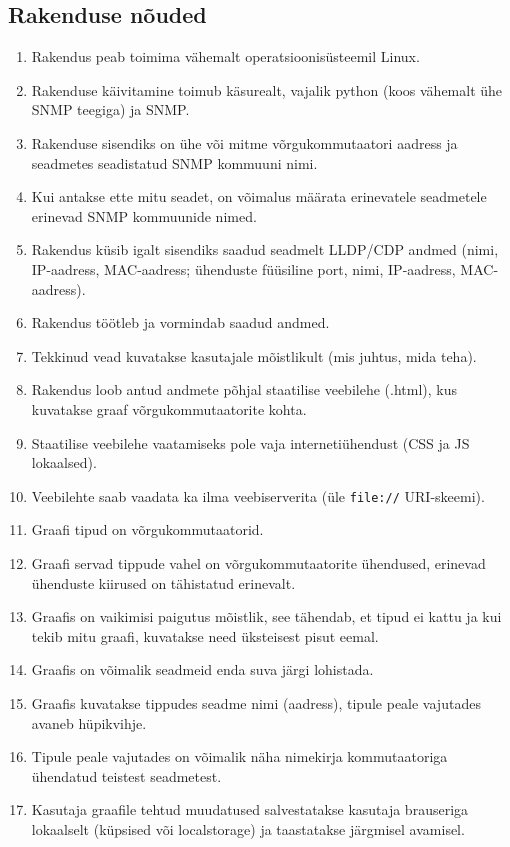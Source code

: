 \documentclass[12pt]{article}
\begin{document}
\subsection{Rakenduse nõuded}
\begin{enumerate}
    \item Rakendus peab toimima vähemalt operatsioonisüsteemil Linux.
    \item Rakenduse käivitamine toimub käsurealt, vajalik python (koos vähemalt ühe SNMP teegiga)
    ja SNMP.
    \item Rakenduse sisendiks on ühe või mitme võrgukommutaatori aadress ja seadmetes seadistatud
    SNMP kommuuni nimi.
    \item \label{itm:req:diffcommunities} Kui antakse ette mitu seadet, on võimalus määrata
    erinevatele seadmetele erinevad SNMP kommuunide nimed.

    \item Rakendus küsib igalt sisendiks saadud seadmelt LLDP/CDP andmed (nimi, IP-aadress,
    MAC-aadress; ühenduste füüsiline port, nimi, IP-aadress, MAC-aadress).
    \item Rakendus töötleb ja vormindab saadud andmed.
    \item Tekkinud vead kuvatakse kasutajale mõistlikult (mis juhtus, mida teha).

    \item Rakendus loob antud andmete põhjal staatilise veebilehe (.html), kus kuvatakse
    graaf võrgukommutaatorite kohta.
    \item Staatilise veebilehe vaatamiseks pole vaja internetiühendust (CSS ja JS lokaalsed).
    \item Veebilehte saab vaadata ka ilma veebiserverita (üle \texttt{file://} URI-skeemi).
    \item \label{itm:req:nodesSwitches} Graafi tipud on võrgukommutaatorid.
    \item \label{itm:req:edgesSwitchConnections} Graafi servad tippude vahel on võrgukommutaatorite
    ühendused, erinevad ühenduste kiirused on tähistatud erinevalt.
    \item \label{itm:req:graphLayout}Graafis on vaikimisi paigutus mõistlik, see tähendab, et tipud
    ei kattu ja kui tekib mitu graafi, kuvatakse need üksteisest pisut eemal.
    \item \label{itm:req:dragSwitches} Graafis on võimalik seadmeid enda suva järgi lohistada.
    \item \label{itm:req:popouts} Graafis kuvatakse tippudes seadme nimi (aadress), tipule peale
    vajutades avaneb hüpikvihje.
    \item \label{itm:req:popoutsOtherDevices}Tipule peale vajutades on võimalik näha nimekirja
    kommutaatoriga ühendatud teistest seadmetest.
    \item \label{itm:req:saveChanges} Kasutaja graafile tehtud muudatused salvestatakse
    kasutaja brauseriga lokaalselt (küpsised või localstorage) ja taastatakse järgmisel avamisel.
\end{enumerate}
\end{document}
